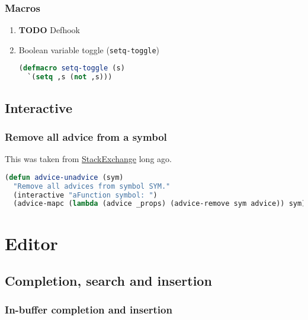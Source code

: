 \documentclass[11pt]{article}
\begin{document}
\subsubsection{Macros}
\label{sec:macros}


\begin{enumerate}
  \item {\bfseries\sffamily TODO} Defhook
  \label{sec:defhook}

  
  \item Boolean variable toggle (\lstinline|setq-toggle|)
  \label{sec:boolean-variable-toggle-setq-toggle}

  \begin{lstlisting}[language=Lisp]
(defmacro setq-toggle (s)
  `(setq ,s (not ,s)))
\end{lstlisting}
\end{enumerate}


\subsection{Interactive}
\label{sec:interactive}


\subsubsection{Remove all advice from a symbol}
\label{sec:remove-all-advice-from-a-symbol}
This was taken from \href{https://emacs.stackexchange.com/a/24658}{StackExchange} long ago.

\begin{lstlisting}[language=Lisp]
(defun advice-unadvice (sym)
  "Remove all advices from symbol SYM."
  (interactive "aFunction symbol: ")
  (advice-mapc (lambda (advice _props) (advice-remove sym advice)) sym))
\end{lstlisting}



\section{Editor}
\label{sec:editor}


\subsection{Completion, search and insertion}
\label{sec:completion-search-and-insertion}


\subsubsection{In-buffer completion and insertion}
\label{sec:in-buffer-completion-and-insertion}
\end{document}

